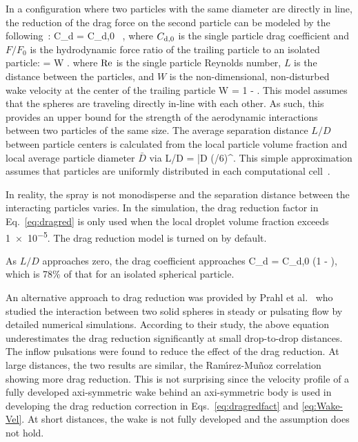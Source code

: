 In a configuration where two particles with the same diameter are directly in line, the reduction of the drag force on the second particle can be modeled by the following~\cite{Ramirez:1}:
\be
  C_{\rm d} = C_{\rm d,0} \, , \label{eq:dragred}
\ee
where $C_{\rm d,0}$ is the single particle drag coefficient and $F / F_0$ is the hydrodynamic force ratio of the trailing particle to an isolated particle:
\be
   = W . \label{eq:dragredfact}
\ee
where $\hbox{Re}$ is the single particle Reynolds number, $L$ is the distance between the particles, and $W$ is the non-dimensional, non-disturbed wake velocity at the center of the trailing particle
\be
  W = 1 -  . \label{eq:Wake-Vel}
\ee
This model assumes that the spheres are traveling directly in-line with each other. As such, this provides an upper bound for the strength of the aerodynamic interactions between two particles of the same size. The average separation distance $L/D$ between particle centers is calculated from the local particle volume fraction and local average particle diameter $\bar{D}$ via
\be
  L/D = \bar{D} \left(\pi/6\alpha \right)^{}.
\ee
This simple approximation assumes that particles are uniformly distributed in each computational cell~\cite{Bhattacharyya2008}.

In reality, the spray is not monodisperse and the separation distance between the interacting particles varies. In the simulation, the drag reduction factor in Eq.~\ref{eq:dragred} is only used when the local droplet volume fraction exceeds \num{1e-5}. The drag reduction model is turned on by default.

As $L/D$ approaches zero, the drag coefficient approaches
\be
  C_{\rm d} = C_{\rm d,0} \left(1 - \right),
\ee
which is 78\% of that for an isolated spherical particle.

An alternative approach to drag reduction was provided by Prahl et al.~\cite{Prahl:1} who studied the interaction between two solid spheres in steady or pulsating flow by detailed numerical simulations. According to their study, the above equation underestimates the drag reduction significantly at small drop-to-drop distances. The inflow pulsations were found to reduce the effect of the drag reduction. At large distances, the two results are similar, the Ram\'{\i}rez-Mu\~{n}oz correlation showing more drag reduction. This is not surprising since the velocity profile of a fully developed axi-symmetric wake behind an axi-symmetric body is used in developing the drag reduction correction in Eqs.~\ref{eq:dragredfact} and \ref{eq:Wake-Vel}. At short distances, the wake is not fully developed and the assumption does not hold.

